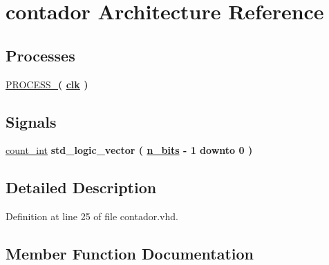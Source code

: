 \hypertarget{classcontador_1_1contador}{}\section{contador Architecture Reference}
\label{classcontador_1_1contador}
\subsection*{Processes}
 \begin{DoxyCompactItemize}
\item 
\hyperlink{classcontador_1_1contador_a00d9e7e8c17b5cd71bc4c4b432911468}{P\+R\+O\+C\+E\+S\+S\+\_}{\bfseries  ( {\bfseries {\bfseries \hyperlink{classcontador_a4a4609c199d30b3adebbeb3a01276ec5}{clk}} \textcolor{vhdlchar}{ }} )}
\end{DoxyCompactItemize}
\subsection*{Signals}
 \begin{DoxyCompactItemize}
\item 
\hyperlink{classcontador_1_1contador_a591dd47ce674ec0d3b488d8705b8e838}{count\+\_\+int} {\bfseries \textcolor{comment}{std\+\_\+logic\+\_\+vector}\textcolor{vhdlchar}{ }\textcolor{vhdlchar}{(}\textcolor{vhdlchar}{ }\textcolor{vhdlchar}{ }\textcolor{vhdlchar}{ }\textcolor{vhdlchar}{ }{\bfseries \hyperlink{classcontador_a986eb173f34190032418b47b9fc9b457}{n\+\_\+bits}} \textcolor{vhdlchar}{-\/}\textcolor{vhdlchar}{ } \textcolor{vhdldigit}{1} \textcolor{vhdlchar}{ }\textcolor{keywordflow}{downto}\textcolor{vhdlchar}{ }\textcolor{vhdlchar}{ } \textcolor{vhdldigit}{0} \textcolor{vhdlchar}{ }\textcolor{vhdlchar}{)}\textcolor{vhdlchar}{ }} 
\end{DoxyCompactItemize}


\subsection{Detailed Description}


Definition at line 25 of file contador.\+vhd.



\subsection{Member Function Documentation}
\hypertarget{classcontador_1_1contador_a00d9e7e8c17b5cd71bc4c4b432911468}{}
